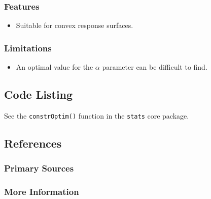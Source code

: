 \subsubsection{Features}

\begin{itemize}
	\item Suitable for convex response surfaces.
\end{itemize}

\subsubsection{Limitations}

\begin{itemize}
	\item An optimal value for the $\alpha$ parameter can be difficult to find.
\end{itemize}


\subsection{Code Listing}

See the \texttt{constrOptim()} function in the \texttt{stats} core package.


\subsection{References}

\subsubsection{Primary Sources}


\subsubsection{More Information}




